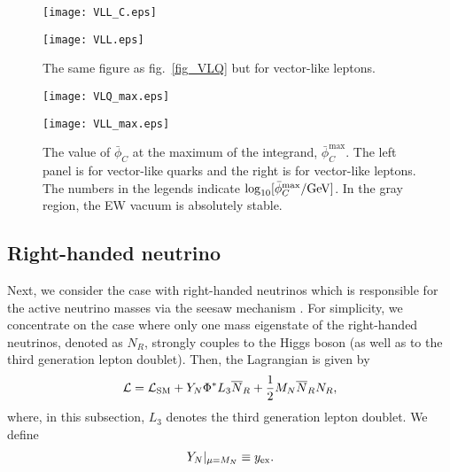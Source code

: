 \documentclass[12pt]{article}
\begin{document}
\begin{figure}[t]
 \begin{minipage}{0.49\linewidth}
  \begin{center}
   \texttt{[image: VLL\_C.eps]}
  \end{center}
 \end{minipage}
 \begin{minipage}{0.49\linewidth}
  \begin{center}
   \texttt{[image: VLL.eps]}
  \end{center}
 \end{minipage}
 \caption{The same figure as fig.\ \ref{fig_VLQ} but for vector-like
  leptons.}  \label{fig_VLL}
\end{figure}

\begin{figure}[t]
 \begin{minipage}{0.49\linewidth}
  \begin{center}
   \texttt{[image: VLQ\_max.eps]}
  \end{center}
 \end{minipage}
 \begin{minipage}{0.49\linewidth}
  \begin{center}
   \texttt{[image: VLL\_max.eps]}
  \end{center}
 \end{minipage}
 \caption{The value of $\bar\phi_C$ at the maximum of the integrand,
 $\bar\phi_C^{\max}$. The left panel is for vector-like quarks and the
 right is for vector-like leptons. The numbers in the legends indicate
 $\log_{10}[\bar\phi_C^{\max}/{\rm GeV}]$. In the gray region, the EW
 vacuum is absolutely stable.  }  \label{fig_cutoffVLF}
\end{figure}


\subsection{Right-handed neutrino}

Next, we consider the case with right-handed neutrinos which is
responsible for the active neutrino masses via the seesaw mechanism
\cite{??????}.  For simplicity, we concentrate on the case where only
one mass eigenstate of the right-handed neutrinos, denoted as $N_R$,
strongly couples to the Higgs boson (as well as to the third generation
lepton doublet).  Then, the Lagrangian is given by
\begin{align}
  \mathcal L = \mathcal L_{\rm SM}
  +Y_N\Phi^* L_3 \overline{N}_R
  +\frac{1}{2}M_N\overline{N}_RN_R,
\end{align}
where, in this subsection, $L_3$ denotes the third generation lepton
doublet. We define
\begin{align}
  Y_N|_{\mu=M_N} \equiv y_{\rm ex}.
  \label{eq_RGEboundary}
\end{align}
\end{document}
